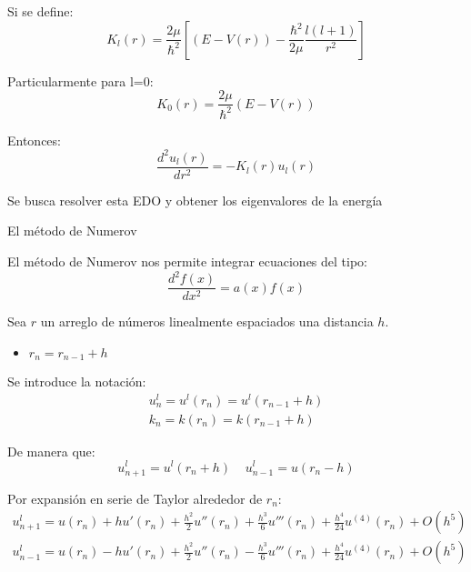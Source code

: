 \begin{frame}{}

Si se define:
\begin{equation*}
    K_{l}(r) = \frac{2\mu}{\hbar^{2}} \left[(E-V(r)) - \frac{\hbar^{2}}{2\mu} \frac{l(l+1)}{r^{2}} \right]
\end{equation*}

Particularmente para l=0:
\begin{equation*}
    K_{0}(r) = \frac{2\mu}{\hbar^{2}} (E-V(r))
\end{equation*}

Entonces:
\begin{equation*}
    \frac{d^{2}u_{l}(r)}{dr^{2}} = -K_{l}(r)u_{l}(r)
\end{equation*}

\vspace{5mm}
Se busca resolver esta EDO y obtener los eigenvalores de la energía
    
\end{frame}

\begin{frame}{El método de Numerov}

El método de Numerov nos permite integrar ecuaciones del tipo:
\begin{equation*}
    \frac{d^{2}f(x)}{dx^{2}} = a(x)f(x)
\end{equation*}

Sea $r$ un arreglo de números linealmente espaciados una distancia $h$.
\begin{itemize}
    \item $r_{n} = r_{n-1} + h$
\end{itemize}

Se introduce la notación:
\begin{gather*}
    u_{n}^{l} = u^{l}(r_{n}) = u^{l}(r_{n-1}+h) \\
    k_{n} = k(r_{n}) = k(r_{n-1}+h)
\end{gather*}

\end{frame}

\begin{frame}{}

De manera que:
\begin{equation*}
    u_{n+1}^{l} = u^{l}(r_{n}+h) \;\;\;\; u_{n-1}^{l} = u(r_{n}-h)
\end{equation*}

Por expansión en serie de Taylor alrededor de $r_{n}$:
\begin{gather}
    u_{n+1}^{l} = u(r_{n}) + hu'(r_{n}) + \frac{h^{2}}{2}u''(r_{n}) + \frac{h^{3}}{6}u'''(r_{n}) + \frac{h^{4}}{24}u^{(4)}(r_{n}) + O(h^{5}) \\
    u_{n-1}^{l} = u(r_{n}) - hu'(r_{n}) + \frac{h^{2}}{2}u''(r_{n}) - \frac{h^{3}}{6}u'''(r_{n}) + \frac{h^{4}}{24}u^{(4)}(r_{n}) + O(h^{5})
\end{gather}
    
\end{frame}

